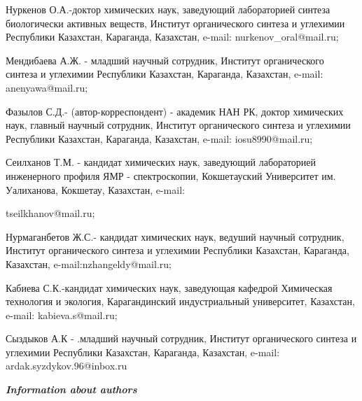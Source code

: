 \begin{noparindent}
Нуркенов О.А.-доктор химических наук, заведующий лабораторией синтеза
биологически активных веществ, Институт органического синтеза и
углехимии Республики Казахстан, Караганда, Казахстан, e-mail:
nurkenov\_oral@mail.ru;

Мендибаева А.Ж. - младший научный сотрудник, Институт органического
синтеза и углехимии Республики Казахстан, Караганда, Казахстан, e-mail:
anenyawa@mail.ru;

Фазылов С.Д.- (автор-корреспондент) - академик НАН РК, доктор химических
наук, главный научный сотрудник, Институт органического синтеза и
углехимии Республики Казахстан, Караганда, Казахстан, e-mail:
iosu8990@mail.ru;

Сеилханов Т.М. - кандидат химических наук, заведующий лабораторией
инженерного профиля ЯМР - спектроскопии, Кокшетауский Университет им.
Уалиханова, Кокшетау, Казахстан, e-mail:

tseilkhanov@mail.ru;

Нурмаганбетов Ж.С.- кандидат химических наук, ведуший научный сотрудник,
Институт органического синтеза и углехимии Республики Казахстан,
Караганда, Казахстан, e-mail:nzhangeldy@mail.ru;

Кабиева С.К.-кандидат химических наук, заведующая кафедрой Химическая
технология и экология, Карагандинский индустриальный университет,
Казахстан, e-mail: kabieva.s@mail.ru;

Сыздыков А.К - .младший научный сотрудник, Институт органического
синтеза и углехимии Республики Казахстан, Караганда, Казахстан, e-mail:
ardak.syzdykov.96@inbox.ru
\end{noparindent}

\emph{{\bfseries Information about authors}}

